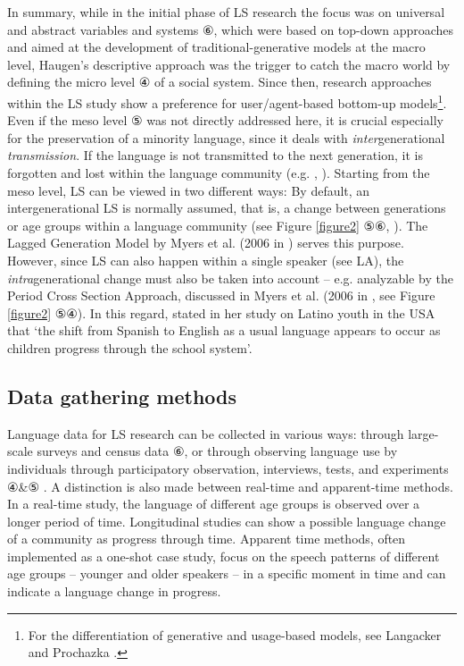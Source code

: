 \documentclass[output=paper,
modfonts
]{langscibook}
\begin{document}
In summary, while in the initial phase of LS research the focus was on universal and abstract variables and systems ⑥, which were based on top-down approaches and aimed at the development of traditional-generative models at the macro level, Haugen's \parencite*{Haugen1972} descriptive approach was the trigger to catch the macro world by defining the micro level ④ of a social system. Since then, research approaches within the LS study show a preference for user/agent-based bottom-up models\footnote{For the differentiation of generative and usage-based models, see Langacker \parencite*{Langacker2000} and Prochazka \parencite*{Prochazka2017}.}. Even if the meso level ⑤ was not directly addressed here, it is crucial especially for the preservation of a minority language, since it deals with \emph{inter}generational \emph{transmission}. If the language is not transmitted to the next generation, it is forgotten and lost within the language community (e.g. \citealt{Gal1979}, \citealt{Brenzinger2003}). Starting from the meso level, LS can be viewed in two different ways: By default, an intergenerational LS is normally assumed, that is, a change between generations or age groups within a language community (see Figure \ref{figure2} ⑤⑥, \citealt{Lieberson1980}). The Lagged Generation Model by Myers et al. (2006 in \citealt{Ortman2008}) serves this purpose. However, since LS can also happen within a single speaker (see LA), the \emph{intra}generational change must also be taken into account -- e.g. analyzable  by the Period Cross Section Approach, discussed in Myers et al. (2006 in \citealt{Ortman2008}, see Figure \ref{figure2} ⑤④). 
In this regard, \cite[1423-1424]{Lutz2006} stated in her study on Latino youth in the USA that ‘the shift from Spanish to English as a usual language appears to occur as children progress through the school system’. 

\subsection{Data gathering methods}

Language data for LS research can be collected in various ways: through large-scale surveys and census data ⑥, or through observing language use by individuals through participatory observation, interviews, tests, and experiments ④\&⑤ \parencite[48]{Pauwels2016}. A distinction is also made between real-time and apparent-time methods. In a real-time study, the language of different age groups is observed over a longer period of time. Longitudinal studies can show a possible language change of a community as progress through time. Apparent time methods, often implemented as a one-shot case study, focus on the speech patterns of different age groups -- younger and older speakers -- in a specific moment in time and can indicate a language change in progress.
\end{document}

